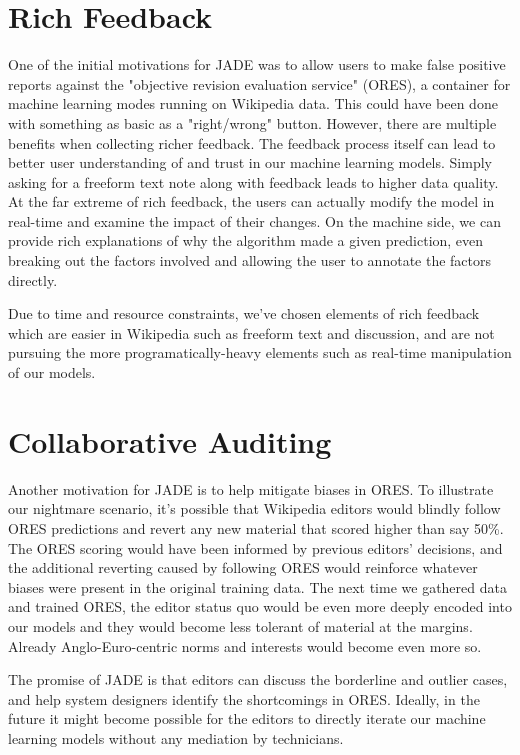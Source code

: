 \documentclass{sigchi-ext}
\begin{document}
\section{Rich Feedback}

One of the initial motivations for JADE was to allow users to make false positive reports against the "objective revision evaluation service" (ORES), a container for machine learning modes running on Wikipedia data.  This could have been done with something as basic as a "right/wrong" button.  However, there are multiple benefits when collecting richer feedback.  The feedback process itself can lead to better user understanding of and trust in our machine learning models.  Simply asking for a freeform text note along with feedback leads to higher data quality.  At the far extreme of rich feedback, the users can actually modify the model in real-time and examine the impact of their changes.\cite{amershi2014power} \cite{stumpf2009interacting}  On the machine side, we can provide rich explanations of why the algorithm made a given prediction, even breaking out the factors involved and allowing the user to annotate the factors directly.

Due to time and resource constraints, we've chosen elements of rich feedback which are easier in Wikipedia such as freeform text and discussion, and are not pursuing the more programatically-heavy elements such as real-time manipulation of our models.

\section{Collaborative Auditing}

Another motivation for JADE is to help mitigate biases in ORES.  To illustrate our nightmare scenario, it's possible that Wikipedia editors would blindly follow ORES predictions and revert any new material that scored higher than say 50\%.  The ORES scoring would have been informed by previous editors' decisions, and the additional reverting caused by following ORES would reinforce whatever biases were present in the original training data.  The next time we gathered data and trained ORES, the editor status quo would be even more deeply encoded into our models and they would become less tolerant of material at the margins.  Already Anglo-Euro-centric norms and interests would become even more so.

The promise of JADE is that editors can discuss the borderline and outlier cases, and help system designers identify the shortcomings in ORES.  Ideally, in the future it might become possible for the editors to directly iterate our machine learning models without any mediation by technicians.
\end{document}

